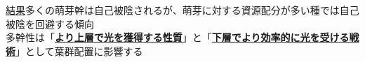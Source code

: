 \documentclass[a0, 36pt, plainboxedsections]{sciposter} %
\begin{document}
\begin{multicols}{2}
\begin{mdframed}[style=conclusion.frame]
{  \vspace{0.4em}
  \underline{結果}多くの萌芽幹は自己被陰されるが、萌芽に対する資源配分が多い種では自己被陰を回避する傾向\\
  \faHandLeft \vspace{0.02em} 多幹性は「\underline{\textbf{より上層で光を獲得する性質}}」と「\underline{\textbf{下層でより効率的に光を受ける戦術}}」として葉群配置に影響する %
  }
\end{mdframed}
\end{multicols}
\begin{mdframed}[style=section.frame]
  \centering\huge\textbf{}
\end{mdframed}
\end{document}
